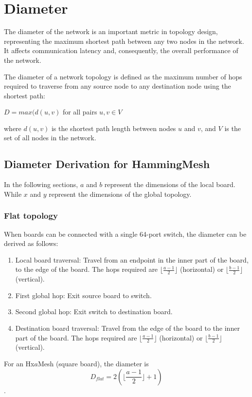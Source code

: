 \documentclass{article}
\begin{document}
\section{Diameter}

The diameter of the network is an important metric in topology design, representing the maximum shortest path between any two nodes in the network. It affects communication latency and, consequently, the overall performance of the network.

The diameter of a network topology is defined as the maximum number of hops required to traverse from any source node to any destination node using the shortest path:

\(D = max(d(u,v)\) for all pairs \(u, v \in V\)

where \(d(u,v)\) is the shortest path length between nodes \(u\) and \(v\), and \(V\) is the set of all nodes in the network.

\subsection{Diameter Derivation for HammingMesh}

In the following sections, \(a\) and \(b\) represent the dimensions of the local board. While \(x\) and \(y\) represent the dimensions of the global topology.

\subsubsection{Flat topology}
When boards can be connected with a single 64-port switch, the diameter can be derived as follows:
\begin{enumerate}
    \item Local board traversal: Travel from an endpoint in the inner part of the board, to the edge of the board. The hops required are \(\lfloor \frac{a-1}{2} \rfloor\) (horizontal) or \(\lfloor \frac{b-1}{2} \rfloor\) (vertical).
    \item First global hop: Exit source board to switch.
    \item Second global hop: Exit switch to destination board.
    \item Destination board traversal: Travel from the edge of the board to the inner part of the board. The hops required are \(\lfloor \frac{a-1}{2} \rfloor\) (horizontal) or \(\lfloor \frac{b-1}{2} \rfloor\) (vertical).
\end{enumerate}


For an Hx\(a\)Mesh (square board), the diameter is \[D_{flat} = 2(\lfloor \frac{a-1}{2} \rfloor + 1)\].
\end{document}
